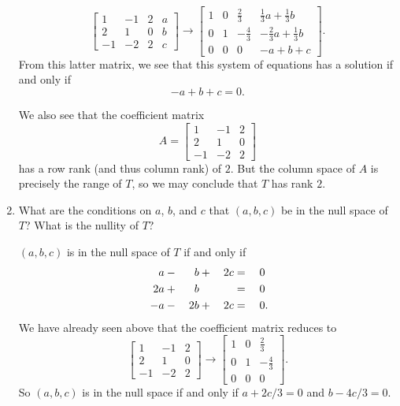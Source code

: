 \begin{enumerate}
\begin{solution}
\begin{equation*}
      \begin{bmatrix}
        1 & -1 & 2 & a \\
        2 & 1 & 0 & b\\
        -1 & -2 & 2 & c
      \end{bmatrix}
      \rightarrow
      \begin{bmatrix}
        1 & 0 & \frac23 & \frac13a + \frac13b \\[3pt]
        0 & 1 & -\frac43 & -\frac23a + \frac13b \\[3pt]
        0 & 0 & 0 & -a + b + c
      \end{bmatrix}.
    \end{equation*}
    From this latter matrix, we see that this system of equations has
    a solution if and only if
    \begin{equation*}
      -a + b + c = 0.
    \end{equation*}

    We also see that the coefficient matrix
    \begin{equation*}
      A =
      \begin{bmatrix}
        1 & -1 & 2 \\
        2 & 1 & 0 \\
        -1 & -2 & 2
      \end{bmatrix}
    \end{equation*}
    has a row rank (and thus column rank) of $2$. But the column space
    of $A$ is precisely the range of $T$, so we may conclude that $T$
    has rank $2$.
  \end{solution}
\item What are the conditions on $a$, $b$, and $c$ that $(a,b,c)$ be
  in the null space of $T$? What is the nullity of $T$?
  \begin{solution}
    $(a, b, c)$ is in the null space of $T$ if and only if
    \begin{alignat*}{4}
      a &{}-{}& b &{}+{}& 2c &{}={}& 0 \\
      2a &{}+{}& b && &{}={}& 0 \\
      -a &{}-{}& 2b &{}+{}& 2c &{}={}& 0\rlap.
    \end{alignat*}
    We have already seen above that the coefficient matrix reduces to
    \begin{equation*}
      \begin{bmatrix}
        1 & -1 & 2 \\
        2 & 1 & 0\\
        -1 & -2 & 2
      \end{bmatrix}
      \rightarrow
      \begin{bmatrix}
        1 & 0 & \frac23 \\[3pt]
        0 & 1 & -\frac43 \\[3pt]
        0 & 0 & 0
      \end{bmatrix}.
    \end{equation*}
    So $(a, b, c)$ is in the null space if and only if $a + 2c/3 = 0$
    and $b - 4c/3 = 0$.


\end{solution}
\end{enumerate}
